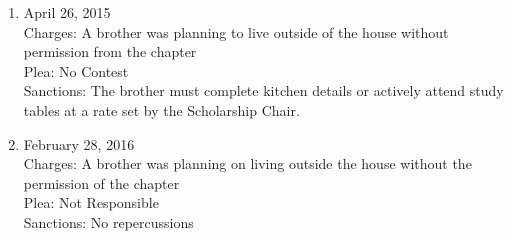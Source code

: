 \begin{enumerate}
	\item April 26, 2015\\Charges: A brother was planning to live outside of the house without permission from the chapter\\Plea: No Contest\\Sanctions: The brother must complete kitchen details or actively attend study tables at a rate set by the Scholarship Chair.
	\item February 28, 2016\\Charges: A brother was planning on living outside the house without the permission of the chapter\\Plea: Not Responsible\\Sanctions: No repercussions
\end{enumerate}

